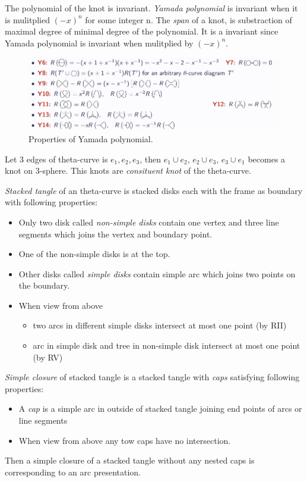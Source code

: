 \documentclass{article}
\theoremstyle{definition}
\theoremstyle{theorem}
\theoremstyle{proposition}
\theoremstyle{corollary}
\begin{document}
The polynomial of the knot is invariant. \textit{Yamada polynomial} is invariant when it is mulitplied $(-x)^n$ for some integer n. The \textit{span} of a knot, is substraction of maximal degree of minimal degree of the polynomial. It is a invariant since Yamada polynomial is invariant when mulitplied by $(-x)^n$.\\

\begin{figure}[h]
    \centerline{\includegraphics[width=0.75\linewidth]{yamada_property.png}}
    \caption{Properties of Yamada polynomial.}
    \label{figure_3}
\end{figure}

Let 3 edges of theta-curve is $e_1, e_2, e_3$, then $e_1 \cup e_2$, $e_2 \cup e_3$, $e_3 \cup e_1$ becomes a knot on 3-sphere. This knots are \textit{consituent knot} of the theta-curve.

\textit{Stacked tangle} of an theta-curve is stacked disks each with the frame as boundary with following properties:
\begin{itemize}
\item Only two disk called \textit{non-simple disks} contain one vertex and three line
segments which joins the vertex and boundary point.
\item One of the non-simple disks is at the top.
\item Other disks called \textit{simple disks} contain simple arc which joins two
points on the boundary.
\item When view from above
\begin{itemize}
    \item two arcs in different simple disks intersect at most one point (by RII)
    \item arc in simple disk and tree in non-simple disk intersect at most one
point (by RV)
\end{itemize}
\end{itemize}

\textit{Simple closure} of stacked tangle is a stacked tangle with \textit{caps} satisfying following properties:
\begin{itemize}
    \item A \textit{cap} is a simple arc in outside of stacked tangle joining end points of arcs or line segments
    \item When view from above any tow caps have no intersection.
\end{itemize}
Then a simple closure of a stacked tangle without any nested caps is
corresponding to an arc presentation.\\
\end{document}
